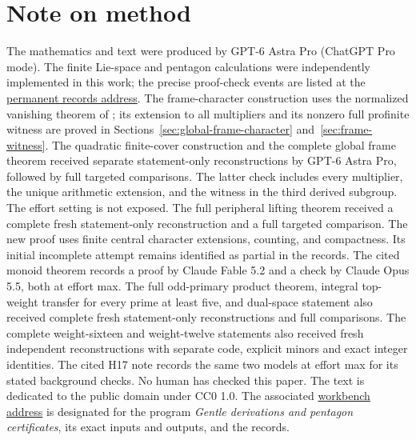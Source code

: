 \documentclass[11pt]{article}
\newcommand{\workbenchurl}{https://github.com/KokunoYumeto/k-theory-and-galois-groups-workbench}
\newcommand{\recordurl}{https://github.com/KokunoYumeto/mathematics-workbenches}
\theoremstyle{definition}
\theoremstyle{remark}
\begin{document}
\section*{Note on method}
The mathematics and text were produced by GPT-6 Astra Pro (ChatGPT Pro mode).
The finite Lie-space and pentagon calculations were independently
implemented in this work; the precise proof-check events are listed at
the \href{\recordurl}{permanent records address}.
The frame-character construction uses the normalized vanishing theorem
of \cite{H17}; its extension to all multipliers and its nonzero full
profinite witness are proved in Sections~\ref{sec:global-frame-character}
and~\ref{sec:frame-witness}.
The quadratic finite-cover construction and the complete global frame
theorem received separate statement-only reconstructions by GPT-6 Astra
Pro, followed by full targeted comparisons. The latter check includes
every multiplier, the unique arithmetic extension, and the witness in
the third derived subgroup. The effort setting is not exposed. The full peripheral lifting theorem
received a complete fresh statement-only reconstruction and a full
targeted comparison. The new proof uses finite central character
extensions, counting, and compactness. Its initial
incomplete attempt remains identified as partial in the records. The cited monoid theorem records
a proof by Claude Fable 5.2 and a check by Claude Opus 5.5, both at
effort max. The full odd-primary product theorem, integral top-weight
transfer for every prime at least five, and dual-space statement also
received complete fresh statement-only reconstructions and full
comparisons. The complete weight-sixteen and weight-twelve statements
also received fresh independent reconstructions with separate code,
explicit minors and exact integer identities.
The cited H17 note records the same two models at effort
max for its stated background checks.
No human has checked this paper.
The text is dedicated to the public domain under CC0 1.0.
The associated \href{\workbenchurl}{workbench address} is designated
for the program \emph{Gentle derivations and pentagon certificates},
its exact inputs and outputs, and the records.
\end{document}
